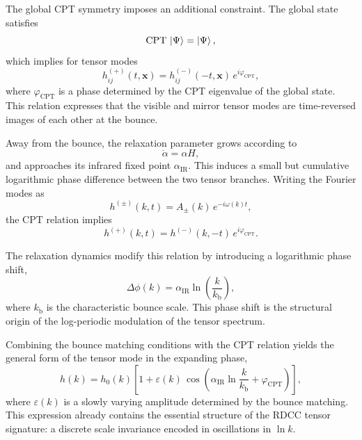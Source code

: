 \documentclass[11pt,a4paper]{article}
\begin{document}
The global CPT symmetry imposes an additional constraint. The global state satisfies
\begin{equation}
    \mathrm{CPT}\,\ket{\Psi} = \ket{\Psi},
\end{equation}
which implies for tensor modes
\begin{equation}
    h^{(+)}_{ij}(t,\mathbf{x})
    = h^{(-)}_{ij}(-t,\mathbf{x})\, e^{i\varphi_{\mathrm{CPT}}},
\end{equation}
where $\varphi_{\mathrm{CPT}}$ is a phase determined by the CPT eigenvalue of the global
state. This relation expresses that the visible and mirror tensor modes are time-reversed
images of each other at the bounce.

Away from the bounce, the relaxation parameter grows according to
\begin{equation}
    \dot{\alpha} = \alpha H,
\end{equation}
and approaches its infrared fixed point $\alpha_{\mathrm{IR}}$. This induces a small but
cumulative logarithmic phase difference between the two tensor branches. Writing the
Fourier modes as
\begin{equation}
    h^{(\pm)}(k,t)
    = A_{\pm}(k)\, e^{-i\omega(k)t},
\end{equation}
the CPT relation implies
\begin{equation}
    h^{(+)}(k,t)
    = h^{(-)}(k,-t)\, e^{i\varphi_{\mathrm{CPT}}}.
\end{equation}

The relaxation dynamics modify this relation by introducing a logarithmic phase shift,
\begin{equation}
    \Delta\phi(k)
    = \alpha_{\mathrm{IR}} \ln\!\left( \frac{k}{k_{\mathrm{b}}} \right),
\end{equation}
where $k_{\mathrm{b}}$ is the characteristic bounce scale. This phase shift is the structural
origin of the log-periodic modulation of the tensor spectrum.

Combining the bounce matching conditions with the CPT relation yields the general
form of the tensor mode in the expanding phase,
\begin{equation}
    h(k)
    = h_{0}(k)\left[
        1 + \varepsilon(k)\,
        \cos\!\left(
            \alpha_{\mathrm{IR}} \ln\!\frac{k}{k_{\mathrm{b}}}
            + \varphi_{\mathrm{CPT}}
        \right)
    \right],
\end{equation}
where $\varepsilon(k)$ is a slowly varying amplitude determined by the bounce matching.
This expression already contains the essential structure of the RDCC tensor signature:
a discrete scale invariance encoded in oscillations in $\ln k$.
\end{document}
